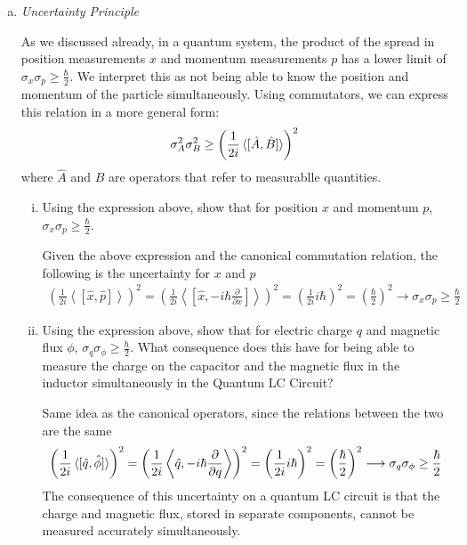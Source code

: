 \documentclass[10pt,letterpaper]{article}
\begin{document}
\begin{enumerate}
\begin{enumerate}[a)]
\begin{enumerate}[i)]
\end{enumerate}

\item \textit{Uncertainty Principle}

As we discussed already, in a quantum system, the product of the spread in position measurements $x$ and momentum measurements $p$ has a lower limit of $\sigma_{x}\sigma_{p} \geq \frac{\hbar}{2}$. We interpret this as not being able to know the position and momentum of the particle simultaneously. Using commutators, we can express this relation in a more general form:
$$\sigma_{A}^{2}\sigma_{B}^{2} \geq \left( \frac{1}{2i} \braket{[\hat{A}, \hat{B}]} \right)^{2}$$
where $\hat{A}$ and $\hat{B}$ are operators that refer to measurablle quantities. 

\begin{enumerate}[i)]

\item Using the expression above, show that for position $x$ and momentum $p$, $\sigma_{x}\sigma_{p} \geq \frac{\hbar}{2}$.

\color{violet}
Given the above expression and the canonical commutation relation, the following is the uncertainty for $x$ and $p$
\begin{gather*}
\left( \frac{1}{2i} \left\langle  \left[ \hat{x}, \hat{p} \right] \right\rangle \right)^{2} = \left( \frac{1}{2i} \left\langle  \left[ \hat{x}, -i\hbar \frac{\partial}{\partial x} \right] \right\rangle \right)^{2} = \left( \frac{1}{2i} i\hbar \right)^{2} = \left( \frac{\hbar}{2} \right)^{2} \longrightarrow \sigma_{x}\sigma_{p} \geq \frac{\hbar}{2}
\end{gather*}
\color{black}

\item Using the expression above, show that for electric charge $q$ and magnetic flux $\phi$, $\sigma_{q}\sigma_{\phi} \geq \frac{\hbar}{2}$. What consequence does this have for being able to measure the charge on the capacitor and the magnetic flux in the inductor simultaneously in the Quantum LC Circuit?

\color{violet}
Same idea as the canonical operators, since the relations between the two are the same
\begin{gather*}
\left( \frac{1}{2i} \braket{[\hat{q}, \hat{\phi}]} \right)^{2} = \left( \frac{1}{2i} \left\langle \hat{q}, -i\hbar\frac{\partial}{\partial q} \right\rangle \right)^{2} = \left( \frac{
1}{2i} i\hbar \right)^{2} = \left( \frac{\hbar}{2} \right)^{2} \longrightarrow \sigma_{q}\sigma_{\phi} \geq \frac{\hbar}{2}
\end{gather*}
The consequence of this uncertainty on a quantum LC circuit is that the charge and magnetic flux, stored in separate components, cannot be measured accurately simultaneously. 
\color{black}

\end{enumerate}

\end{enumerate}

\end{enumerate}
\end{document}
